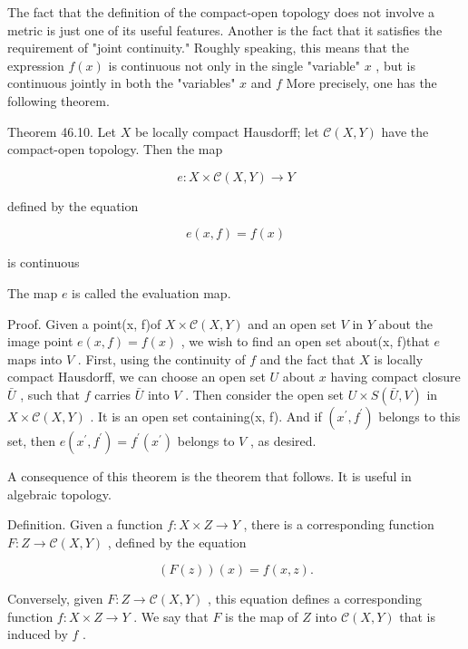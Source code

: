 The fact that the definition of the compact-open topology does not involve a metric is just one of its useful features. Another is the fact that it satisfies the requirement of "joint continuity." Roughly speaking, this means that the expression \(f\left( x\right)\) is continuous not only in the single "variable" \(x\) , but is continuous jointly in both the "variables" \(x\) and \(f\) More precisely, one has the following theorem.

Theorem 46.10. Let \(X\) be locally compact Hausdorff; let \(\mathcal{C}\left( {X,Y}\right)\) have the compact-open topology. Then the map

\[
e : X \times  \mathcal{C}\left( {X,Y}\right)  \rightarrow  Y
\]

defined by the equation

\[
e\left( {x,f}\right)  = f\left( x\right)
\]

is continuous

The map \(e\) is called the evaluation map.

Proof. Given a point(x, f)of \(X \times  \mathcal{C}\left( {X,Y}\right)\) and an open set \(V\) in \(Y\) about the image point \(e\left( {x,f}\right)  = f\left( x\right)\) , we wish to find an open set about(x, f)that \(e\) maps into \(V\) . First, using the continuity of \(f\) and the fact that \(X\) is locally compact Hausdorff, we can choose an open set \(U\) about \(x\) having compact closure \(\bar{U}\) , such that \(f\) carries \(\bar{U}\) into \(V\) . Then consider the open set \(U \times  S\left( {\bar{U},V}\right)\) in \(X \times  \mathcal{C}\left( {X,Y}\right)\) . It is an open set containing(x, f). And if \(\left( {{x}^{\prime },{f}^{\prime }}\right)\) belongs to this set, then \(e\left( {{x}^{\prime },{f}^{\prime }}\right)  = {f}^{\prime }\left( {x}^{\prime }\right)\) belongs to \(V\) , as desired.

A consequence of this theorem is the theorem that follows. It is useful in algebraic topology.

Definition. Given a function \(f : X \times  Z \rightarrow  Y\) , there is a corresponding function \(F : Z \rightarrow  \mathcal{C}\left( {X,Y}\right)\) , defined by the equation

\[
\left( {F\left( z\right) }\right) \left( x\right)  = f\left( {x,z}\right) .
\]

Conversely, given \(F : Z \rightarrow  \mathcal{C}\left( {X,Y}\right)\) , this equation defines a corresponding function \(f : X \times  Z \rightarrow  Y\) . We say that \(F\) is the map of \(Z\) into \(\mathcal{C}\left( {X,Y}\right)\) that is induced by \(f\) .

